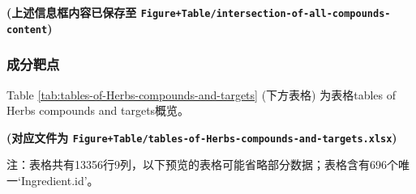 \documentclass[
]{article}
\begin{document}
\textbf{(上述信息框内容已保存至 \texttt{Figure+Table/intersection-of-all-compounds-content})}

\hypertarget{ux6210ux5206ux9776ux70b9}{%
\subsubsection{成分靶点}\label{ux6210ux5206ux9776ux70b9}}

Table \ref{tab:tables-of-Herbs-compounds-and-targets} (下方表格) 为表格tables of Herbs compounds and targets概览。

\textbf{(对应文件为 \texttt{Figure+Table/tables-of-Herbs-compounds-and-targets.xlsx})}

\begin{center}\begin{tcolorbox}[colback=gray!10, colframe=gray!50, width=0.9\linewidth, arc=1mm, boxrule=0.5pt]注：表格共有13356行9列，以下预览的表格可能省略部分数据；表格含有696个唯一`Ingredient.id'。
\end{tcolorbox}
\end{center}
\end{document}
